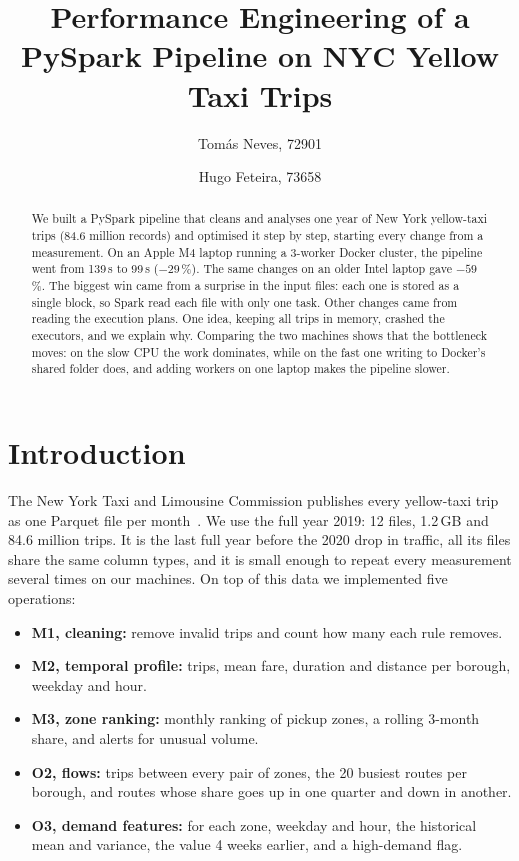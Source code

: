 \documentclass[sigconf]{acmart}
\begin{document}
\title{Performance Engineering of a PySpark Pipeline on NYC Yellow Taxi Trips}

\author{Tomás Neves, 72901}
\author{Hugo Feteira, 73658}

\begin{abstract}
We built a PySpark pipeline that cleans and analyses one year of New York yellow-taxi trips (84.6 million
records) and optimised it step by step, starting every change from a measurement. On an Apple M4 laptop running a
3-worker Docker cluster, the pipeline went from 139\,s to 99\,s ($-29$\,\%). The same changes on an older Intel
laptop gave $-59$\,\%. The biggest win came from a surprise in the input files: each one is stored as a single
block, so Spark read each file with only one task. Other changes came from reading the execution plans. One idea,
keeping all trips in memory, crashed the executors, and we explain why. Comparing the two machines shows that the
bottleneck moves: on the slow CPU the work dominates, while on the fast one writing to Docker's shared folder does,
and adding workers on one laptop makes the pipeline slower.
\end{abstract}

\maketitle

\section{Introduction}

The New York Taxi and Limousine Commission publishes every yellow-taxi trip as one Parquet file per
month~\cite{tlc}. We use the full year 2019: 12 files, 1.2\,GB and 84.6 million trips. It is the last full year
before the 2020 drop in traffic, all its files share the same column types, and it is small enough to repeat every
measurement several times on our machines. On top of this data we
implemented five operations:
\begin{itemize}
  \item \textbf{M1, cleaning:} remove invalid trips and count how many each rule removes.
  \item \textbf{M2, temporal profile:} trips, mean fare, duration and distance per borough, weekday and hour.
  \item \textbf{M3, zone ranking:} monthly ranking of pickup zones, a rolling 3-month share, and alerts for unusual
    volume.
  \item \textbf{O2, flows:} trips between every pair of zones, the 20 busiest routes per borough, and routes whose
    share goes up in one quarter and down in another.
  \item \textbf{O3, demand features:} for each zone, weekday and hour, the historical mean and variance, the value 4
    weeks earlier, and a high-demand flag.
\end{itemize}
\end{document}
